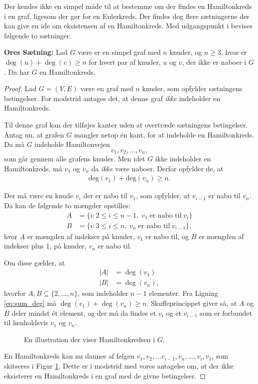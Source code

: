 Der kendes ikke en simpel måde til at bestemme om der findes en Hamiltonkreds i en graf, ligesom der gør for en Eulerkreds. 
Der findes dog flere sætningerne der kan give en ide om eksistensen af en Hamiltonkreds. Med udgangspunkt i \cite{wilson_graph} bevises følgende to sætninger.

\begin{thm} \label{ores_thm}
	\textbf{Ores Sætning:} 
	Lad $G$ være er en simpel graf med $n$ knuder, og $n\geq3$, hvor er $\deg(u)+\deg(v)\geq n$ for hvert par af knuder, $u$ og $v$, der ikke er naboer i $G$. 
	Da har $G$ en Hamiltonkreds. 
\end{thm}

\begin{proof}
	Lad $G=(V,E)$ være en graf med $n$ knuder, som opfylder sætningens betingelser. For modstrid antages det, at denne graf \textit{ikke} indeholder en Hamiltonkreds.

	Til denne graf kan der tilføjes kanter uden at overtræde sætningens betingelser. Antag nu, at grafen $G$ mangler netop én kant, for at indeholde en Hamiltonkreds. 
	Da må $G$ indeholde Hamiltonvejen 
	$$v_1, v_2,...,v_n,$$
	som går gennem alle grafens knuder. 
	Men idet $G$ ikke indeholder en Hamiltonkreds, må $v_1$ og $v_n$ da \textit{ikke} være naboer.
	Derfor opfylder de, at
	\begin{align} \label{eq:sum_deg}
		\textrm{deg}(v_1)+\textrm{deg}(v_n)\geq n.
	\end{align}

	Der må være en knude $v_i$ der er nabo til $v_1$, som opfylder, at $v_{i-1}$ er nabo til $v_n$.
	Da kan de følgende to mængder opstilles:
	\begin{align*}
		A &= \lbrace i: 2 \leq i \leq n-1, \; v_1 \; \textrm{er nabo til} \; v_i \rbrace \\
		B &= \lbrace i: 3 \leq i \leq n, \; v_n \; \textrm{er nabo til} \; v_{i-1} \rbrace,
	\end{align*}
	hvor $A$ er mængden af indekser på knuder, $v_1$ er nabo til, og $B$ er mængden af indekser plus 1, på knuder, $v_n$ er nabo til. 

	Om disse gælder, at
	\begin{align*}
		|A| &= \deg(v_1) \\
		|B| &= \deg(v_n),
	\end{align*}
	hvorfor $A,B \subseteq \lbrace 2,...,n \rbrace$, som indeholder $n-1$ elementer.
	Fra Ligning \eqref{eq:sum_deg} må $\deg(v_1) + \deg(v_n) \geq n$.
	Skuffeprincippet giver så, at $A$ og $B$ deler mindst ét element, og der må da findes et $v_i$ og et $v_{i-1}$ som er forbundet til henholdsvis $v_1$ og $v_n$.

	\begin{figure}[h!]
		\centering
		
		\caption{En illustration der viser Hamiltonkredsen i $G$.} \label{ore_bevis}
	\end{figure}
	
	En Hamiltonkreds kan nu dannes af følgen $v_1, v_2,...v_{i-1},v_n,...,v_i,v_1$,
	som skitseres i Figur \ref{ore_bevis}. Dette er i modstrid med vores antagelse om, at der ikke eksisterer en Hamiltonkreds i en graf med de givne betingelser.	
\end{proof}

